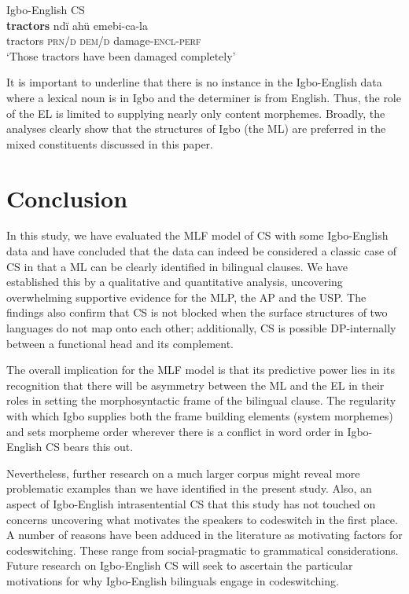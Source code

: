 \documentclass[output=paper]{langsci/langscibook}
\begin{document}
\ea\label{ex:ihemere:23}
{Igbo-English CS}\\
\gll \textbf{tractors}  ndï    ahü  emebi-ca-la\\
     tractors  \textsc{prn/d}    \textsc{dem/d}  damage-\textsc{encl-perf} \\
\glt ‘Those tractors have been damaged completely’
\z

It is important to underline that there is no instance in the Igbo-English data where a lexical noun is in Igbo and the determiner is from English. Thus, the role of the EL is limited to supplying nearly only content morphemes. Broadly, the analyses clearly show that the structures of Igbo (the ML) are preferred in the mixed constituents discussed in this paper.

\section{Conclusion}\label{sec:ihemere:8}

In this study, we have evaluated the MLF model of CS with some Igbo-English data and have concluded that the data can indeed be considered a classic case of CS in that a ML can be clearly identified in bilingual clauses. We have established this by a qualitative and quantitative analysis, uncovering overwhelming supportive evidence for the MLP, the AP and the USP. The findings also confirm that CS is not blocked when the surface structures of two languages do not map onto each other; additionally, CS is possible DP-internally between a functional head and its complement. 

The overall implication for the MLF model is that its predictive power lies in its recognition that there will be asymmetry between the ML and the EL in their roles in setting the morphosyntactic frame of the bilingual clause. The regularity with which Igbo supplies both the frame building elements (system morphemes) and sets morpheme order wherever there is a conflict in word order in Igbo-English CS bears this out. 

Nevertheless, further research on a much larger corpus might reveal more problematic examples than we have identified in the present study. Also, an aspect of Igbo-English intrasentential CS that this study has not touched on concerns uncovering what motivates the speakers to codeswitch in the first place. A number of reasons have been adduced in the literature as motivating factors for codeswitching. These range from social-pragmatic to grammatical considerations. Future research on Igbo-English CS will seek to ascertain the particular motivations for why Igbo-English bilinguals engage in codeswitching.
\end{document}
